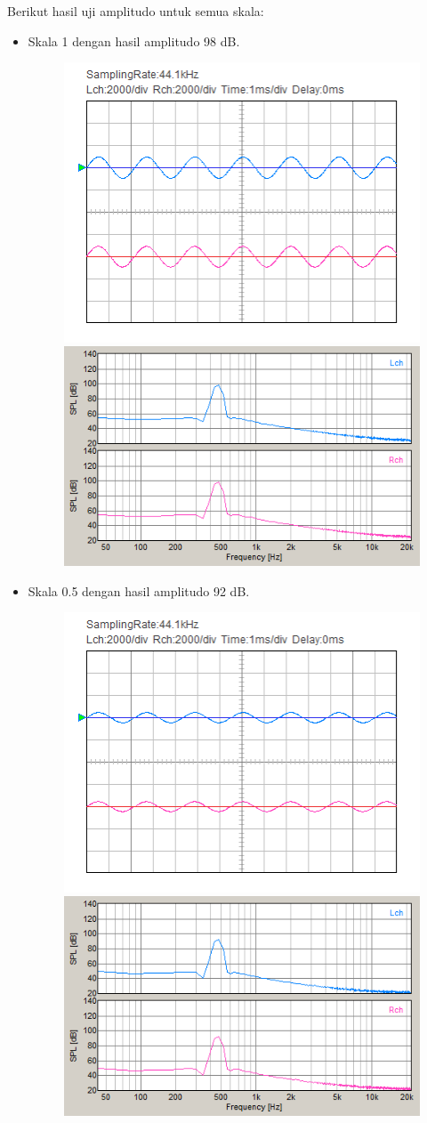 \documentclass[12pt,]{article}
\begin{document}
	Berikut hasil uji amplitudo untuk semua skala:
	\begin{itemize}
		\item Skala 1 dengan hasil amplitudo 98 dB.
		\begin{figure}[H]
			\centering
			\includegraphics[width=0.45\linewidth]{result/day_4/500Hz/tone1}
			\includegraphics[width=0.45\linewidth]{result/day_4/500Hz/fft_tone1}
		\end{figure}

		\item Skala 0.5 dengan hasil amplitudo 92 dB.
		\begin{figure}[H]
			\centering
			\includegraphics[width=0.45\linewidth]{result/day_4/500Hz/tone05}
			\includegraphics[width=0.45\linewidth]{result/day_4/500Hz/fft_tone05}
		\end{figure}


\end{itemize}
\end{document}
